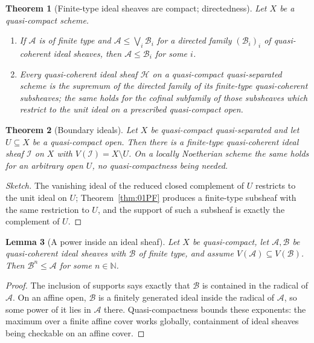 \documentclass[11pt,a4paper]{article}
\theoremstyle{plain}
\newtheorem{theorem}{Theorem}[section]
\newtheorem{lemma}[theorem]{Lemma}
\theoremstyle{definition}
\theoremstyle{remark}
\newcommand{\sH}{\mathcal{H}}
\newcommand{\sI}{\mathcal{I}}
\newcommand{\qcqs}{quasi-compact quasi-separated}
\begin{document}
\begin{theorem}[Finite-type ideal sheaves are compact; directedness]
\label{thm:finite-type-directed}
Let $X$ be a quasi-compact scheme.
\begin{enumerate}[label=\textup{(\roman*)}, itemsep=1pt]
\item If $\mathcal{A}$ is of finite type and $\mathcal{A}\le\bigvee_i\mathcal{B}_i$
      for a directed family $(\mathcal{B}_i)_{i}$ of quasi-coherent ideal
      sheaves, then $\mathcal{A}\le\mathcal{B}_i$ for some $i$.
\item Every quasi-coherent ideal sheaf $\sH$ on a \qcqs{} scheme is the
      supremum of the directed family of its finite-type quasi-coherent
      subsheaves; the same holds for the cofinal subfamily of those subsheaves
      which restrict to the unit ideal on a prescribed quasi-compact open.
\end{enumerate}
\end{theorem}

\begin{theorem}[Boundary ideals]
\label{thm:01PH}
Let $X$ be \qcqs{} and let $U\subseteq X$ be a quasi-compact open. Then there
is a finite-type quasi-coherent ideal sheaf $\sI$ on $X$ with
$V(\sI)=X\setminus U$. On a locally Noetherian scheme the same holds for an
arbitrary open $U$, no quasi-compactness being needed.
\end{theorem}

\begin{proof}[Sketch]
The vanishing ideal of the reduced closed complement of $U$ restricts to the
unit ideal on $U$; Theorem~\ref{thm:01PF} produces a finite-type subsheaf with
the same restriction to $U$, and the support of such a subsheaf is exactly the
complement of $U$.
\end{proof}

\begin{lemma}[A power inside an ideal sheaf]
\label{lem:power-in-ideal}
Let $X$ be quasi-compact, let $\mathcal{A},\mathcal{B}$ be quasi-coherent ideal
sheaves with $\mathcal{B}$ of finite type, and assume
$V(\mathcal{A})\subseteq V(\mathcal{B})$. Then $\mathcal{B}^n\le\mathcal{A}$
for some $n\in\mathbb{N}$.
\end{lemma}

\begin{proof}
The inclusion of supports says exactly that $\mathcal{B}$ is contained in the
radical of $\mathcal{A}$. On an affine open, $\mathcal{B}$ is a finitely
generated ideal inside the radical of $\mathcal{A}$, so some power of it lies in
$\mathcal{A}$ there. Quasi-compactness bounds these exponents: the maximum over
a finite affine cover works globally, containment of ideal sheaves being
checkable on an affine cover.
\end{proof}
\end{document}
